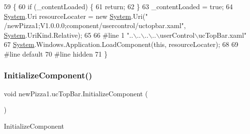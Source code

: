 \begin{DoxyCode}
59                                           \{
60             \textcolor{keywordflow}{if} (\_contentLoaded) \{
61                 \textcolor{keywordflow}{return};
62             \}
63             \_contentLoaded = \textcolor{keyword}{true};
64             \hyperlink{namespaceSystem}{System}.Uri resourceLocater = \textcolor{keyword}{new} \hyperlink{namespaceSystem}{System}.Uri(\textcolor{stringliteral}{"
      /newPizza1;V1.0.0.0;component/usercontrol/uctopbar.xaml"}, \hyperlink{namespaceSystem}{System}.UriKind.Relative);
65             
66 \textcolor{preprocessor}{            #line 1 "..\(\backslash\)..\(\backslash\)..\(\backslash\)..\(\backslash\)userControl\(\backslash\)ucTopBar.xaml"}
67             \hyperlink{namespaceSystem}{System}.Windows.Application.LoadComponent(\textcolor{keyword}{this}, resourceLocater);
68             
69 \textcolor{preprocessor}{            #line default}
70 \textcolor{preprocessor}{            #line hidden}
71         \}
\end{DoxyCode}
\mbox{\label{classnewPizza1_1_1ucTopBar_a667aed93b177538819f27c62e5e88844}} 
\subsubsection{\texorpdfstring{Initialize\+Component()}{InitializeComponent()}\hspace{0.1cm}{\footnotesize\ttfamily [4/6]}}
{\footnotesize\ttfamily void new\+Pizza1.\+uc\+Top\+Bar.\+Initialize\+Component (\begin{DoxyParamCaption}{ }\end{DoxyParamCaption})\hspace{0.3cm}{\ttfamily [inline]}}



Initialize\+Component 


